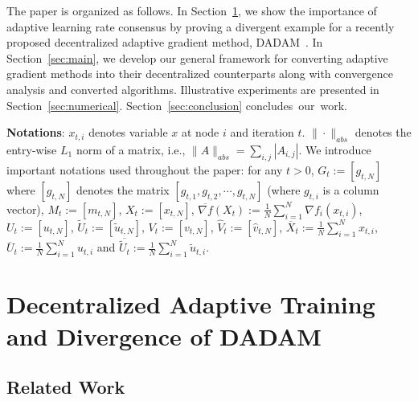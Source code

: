 \documentclass[11pt]{article}
\begin{document}
The paper is organized as follows. In Section~\ref{sec:prelim}, we show the importance of adaptive learning rate consensus by proving a divergent example for a recently proposed decentralized adaptive gradient method, DADAM~\citep{nazari2019dadam}. In Section~\ref{sec:main}, we develop our general framework for converting adaptive gradient methods into their decentralized counterparts along with convergence analysis and converted algorithms. Illustrative experiments are presented in Section~\ref{sec:numerical}. 
Section~\ref{sec:conclusion} concludes~our~work.

\vspace{0.1in}

 \noindent\textbf{Notations}: $x_{t,i}$ denotes variable $x$ at node $i$ and iteration $t$. $\|\cdot \|_{abs}$ denotes the entry-wise $L_1$ norm of a matrix, i.e., $\|A\|_{abs}= \sum_{i,j} |A_{i,j}|$. 
We introduce important notations used throughout the paper: for any $t>0$, $G_t := [g_{t,N}]$ where $[g_{t,N}]$ denotes the matrix $[g_{t,1}, g_{t,2}, \cdots, g_{t,N}]$ (where $g_{t,i}$ is a column vector), $M_t := [m_{t,N}]$, $X_t := [x_{t,N}]$, $\overline {\nabla f}(X_t) := \frac{1}{N}\sum_{i=1}^N \nabla f_i(x_{t,i})$, $U_t := [u_{t,N}]$, $ \tilde U_t := [\tilde u_{t,N}]$, $ V_t := [ v_{t,N}]$, $\hat V_t := [\hat v_{t,N}]$, $\overline X_t := \frac{1}{N}\sum_{i=1}^N x_{t,i} $, $\overline U_t := \frac{1}{N}\sum_{i=1}^N u_{t,i} $ and $\overline {\tilde U_t} := \frac{1}{N}\sum_{i=1}^N  \tilde u_{t,i} $. 


 

\section{Decentralized Adaptive Training and Divergence of DADAM}\label{sec:prelim}


\subsection{Related Work}
\end{document}
